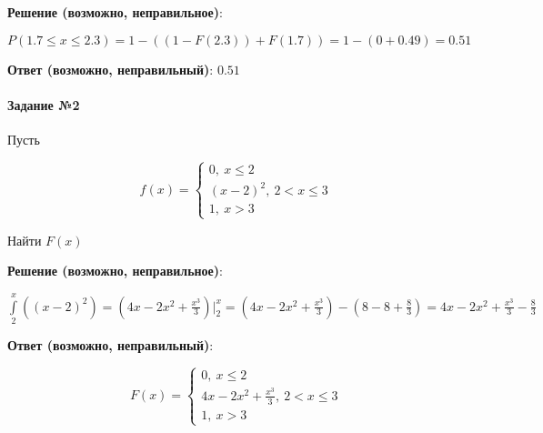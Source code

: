 \documentclass{article}
\begin{document}
\textbf{Решение (возможно, неправильное)}:

$P(1.7 \le x \le 2.3) = 1 - ((1 - F(2.3)) + F(1.7)) = 1 - (0 + 0.49) = 0.51$

\textbf{Ответ (возможно, неправильный)}: $0.51$

\paragraph{Задание №2}

Пусть

$$f(x) = \begin{cases}
    0, \ x \le 2 \\
    (x-2)^2, \ 2 < x \le 3 \\
    1, \ x > 3
\end{cases}$$

Найти $F(x)$

\textbf{Решение (возможно, неправильное)}:

$\int\limits^{x}_{2} ((x-2)^2) = (4 x - 2 x^2 + \frac{x^3}{3}) \bigg|^{x}_{2} = (4x - 2x^2 + \frac{x^3}{3}) - (8 - 8 + \frac{8}{3}) = 4x - 2x^2 + \frac{x^3}{3} - \frac{8}{3}$

\textbf{Ответ (возможно, неправильный)}:

$$F(x) = \begin{cases}
    0, \ x \le 2 \\
    4x - 2x^2 + \frac{x^3}{3}, \ 2 < x \le 3 \\
    1, \ x > 3
\end{cases}$$
\end{document}
